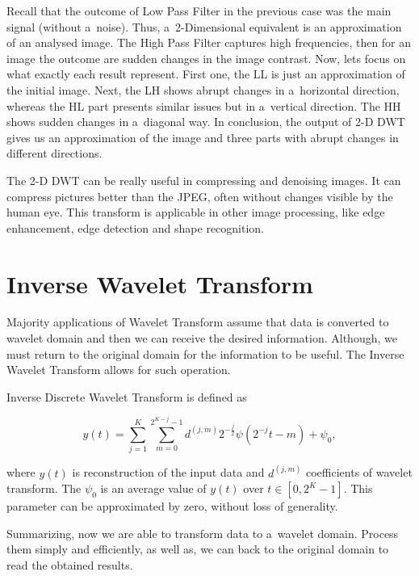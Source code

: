 Recall that the outcome of Low Pass Filter in the previous case was the main signal (without a~noise). Thus, a~2-Dimensional equivalent is an approximation of an analysed image. The High Pass Filter captures high frequencies, then for an image the outcome are sudden changes in the image contrast. Now, lets focus on what exactly each result represent. First one, the LL is just an approximation of the initial image. Next, the LH shows abrupt changes in a~horizontal direction, whereas the HL part presents similar issues but in a~vertical direction. The HH shows sudden changes in a~diagonal way. In conclusion, the output of 2-D DWT gives us an approximation of the image and three parts with abrupt changes in different directions.

The 2-D DWT can be really useful in compressing and denoising images. It can compress pictures better than the JPEG, often without changes visible by the human eye. This transform is applicable in other image processing, like edge enhancement, edge detection and shape recognition.


\section{Inverse Wavelet Transform}

Majority applications of Wavelet Transform assume that data is converted to wavelet domain and then we can receive the desired information. Although, we must return to the original domain for the information to be useful. The Inverse Wavelet Transform allows for such operation.

\begin{defn}
Inverse Discrete Wavelet Transform is defined as

\begin{equation}
y(t) = \sum_{j=1}^{K} \sum_{m=0}^{2^{K-j}-1} d^{(j,m)} 2^{-\frac{j}{2}} \psi\left(2^{-j}t - m\right) + \psi_0,
\end{equation}

where $y(t)$ is reconstruction of the input data and $d^{(j,m)}$ coefficients of wavelet transform. The $\psi_0$ is an average value of $y(t)$ over $t \in [0, 2^K-1]$. This parameter can be approximated by zero, without loss of generality.
\end{defn}

Summarizing, now we are able to transform data to a~wavelet domain. Process them simply and efficiently, as well as, we can back to the original domain to read the obtained results.
